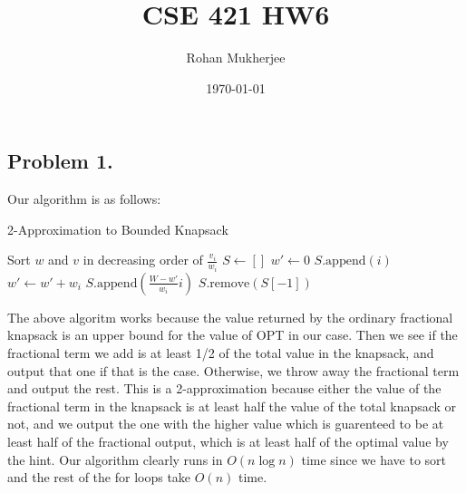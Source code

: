 \documentclass[12pt]{article}
\title{CSE 421 HW6}
\date{\today}
\author{Rohan Mukherjee}
\theoremstyle{definitionstyle}
\begin{document}
    \maketitle
    \subsection*{Problem 1.}
    Our algorithm is as follows:
    \begin{algorithm}
        \caption{2-Approximation to Bounded Knapsack}
        \begin{algorithmic}
                \State Sort $w$ and $v$ in decreasing order of $\frac{v_i}{w_i}$
                \State $S \gets []$
                \State $w' \gets 0$
                            \State $S.\mathrm{append}(i)$
                            \State $w' \gets w' + w_i$
                        \Else
                            \State $S.\mathrm{append}(\frac{W - w'}{w_i} i)$
                        \EndIf
                    \EndIf
                \EndFor
                        \State \Return {}
                    \Else 
                        \State \Return $S.\mathrm{remove}(S[-1])$
                    \EndIf
                \EndIf
            \EndProcedure
        \end{algorithmic}
    \end{algorithm}
    The above algoritm works because the value returned by the ordinary fractional knapsack is an upper bound for the value of OPT in our case. Then we see if the fractional term we add is at least 1/2 of the total value in the knapsack, and output that one if that is the case. Otherwise, we throw away the fractional term and output the rest. This is a 2-approximation because either the value of the fractional term in the knapsack is at least half the value of the total knapsack or not, and we output the one with the higher value which is guarenteed to be at least half of the fractional output, which is at least half of the optimal value by the hint. Our algorithm clearly runs in $O(n \log n)$ time since we have to sort and the rest of the for loops take $O(n)$ time.
\end{document}
